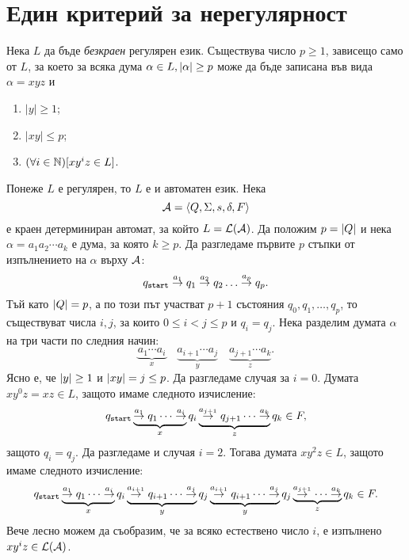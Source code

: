 \section{Един критерий за нерегулярност}

\begin{lemma}
  \label{lem:pumping-reg}
  Нека $L$ да бъде {\em безкраен} регулярен език.
  Съществува число $p\geq 1$, зависещо само от $L$, 
  за което за всяка дума $\alpha\in L, \lvert{\alpha}\rvert\geq p$ може да 
  бъде записана във вида $\alpha = xyz$ и 
  \begin{enumerate}[1)]
  \item
    $|y|\geq 1$;
  \item
    $|xy|\leq p$;
  \item
    $(\forall i\in\mathbb{N})[xy^iz \in L]$.
  \end{enumerate}
\end{lemma}
\begin{hint}
  Понеже $L$ е регулярен, то $L$ е и автоматен език. Нека
  \[\mathcal{A} = \langle{Q,\Sigma,s,\delta,F}\rangle\]
  е краен детерминиран автомат, за който $L = \mathcal{L}(\mathcal{A})$.
  Да положим $p = \lvert{Q}\rvert$ и нека $\alpha = a_1a_2\cdots a_k$ е дума, за която $k \geq p$.
  Да разгледаме първите $p$ стъпки от изпълнението на $\alpha$ върху $\mathcal{A}$:
  \[q_{\texttt{start}}\stackrel{a_1}{\rightarrow} q_1 \stackrel{a_2}{\rightarrow}q_2 \dots \stackrel{a_p}{\rightarrow} q_p.\]
  Тъй като $\lvert{Q}\rvert = p$, а по този път участват $p+1$ състояния $q_0,q_1,\dots,q_p$,
  то съществуват числа $i, j$, за които $0\leq i < j\leq p$ и $q_i = q_j$.
  Нека разделим думата $\alpha$ на три части по следния начин:
  \[\underbrace{a_1\cdots a_i}_{x}\quad \underbrace{a_{i+1}\cdots a_j}_{y}\quad \underbrace{a_{j+1}\cdots a_k}_{z}.\]
  Ясно е, че $\lvert{y}\rvert \geq 1$ и $\lvert{xy}\rvert = j \leq p$.
  Да разгледаме случая за $i = 0$.
  Думата $xy^0z = xz \in L$, защото имаме следното изчисление:
  \[q_{\texttt{start}}\underbrace{\stackrel{a_1}{\rightarrow}q_1 \cdots \stackrel{a_i}{\rightarrow}}_{x} q_i\underbrace{\stackrel{a_{j+1}}{\rightarrow}q_{j+1}\cdots\stackrel{a_{k}}{\rightarrow}}_{z}q_k\in F,\]
  защото $q_i = q_j$.
  Да разгледаме и случая $i = 2$. Тогава думата $xy^2z \in L$, защото имаме следното изчисление:
  \[q_{\texttt{start}}\underbrace{\stackrel{a_1}{\rightarrow}q_1 \cdots \stackrel{a_i}{\rightarrow}}_{x} q_i\underbrace{\stackrel{a_{i+1}}{\rightarrow}q_{i+1}\cdots\stackrel{a_{j}}{\rightarrow}}_{y}q_j\underbrace{\stackrel{a_{i+1}}{\rightarrow}q_{i+1}\cdots\stackrel{a_{j}}{\rightarrow}}_{y}q_j\underbrace{\stackrel{a_{j+1}}{\rightarrow}\cdots\stackrel{a_{k}}{\rightarrow}}_{z}q_k\in F.\]
  Вече лесно можем да съобразим, че за всяко естествено число $i$, е изпълнено $xy^iz \in \mathcal{L}(\mathcal{A})$.
\end{hint}

